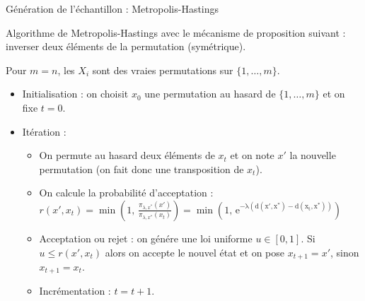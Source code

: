 \documentclass[10pt,xcolor=table,color={dvipsnames,usenames},ignorenonframetext,usepdftitle=false,french]{beamer}
\begin{document}
\begin{frame}{Génération de l'échantillon : Metropolis-Hastings}
\protect\hypertarget{guxe9nuxe9ration-de-luxe9chantillon-metropolis-hastings}{}

Algorithme de Metropolis-Hastings avec le mécanisme de proposition
suivant : inverser deux éléments de la permutation (symétrique).

Pour \(m=n\), les \(X_i\) sont des vraies permutations sur
\(\{1,\dots,m\}\).

\begin{itemize}
\item Initialisation : on choisit $x_0$ une permutation au hasard de $\{1,\dots,m\}$ et on fixe $t=0$.
\item Itération : 
\begin{itemize}
\item On permute au hasard deux éléments de $x_t$ et on note $x'$ la nouvelle permutation (on fait donc une transposition de $x_t$).
\item On calcule la probabilité d'acceptation : $r(x',x_t)=\min\left(1,\,\frac{\pi_{\lambda,x^*}(x')}{\pi_{\lambda,x^*}(x_{t})}\right)
=\min\left(1,\,\mathrm{e^{-\lambda(d(x',x^{*})-d(x_{t},x^{*}))}}\right)$
\item Acceptation ou rejet : on génére une loi uniforme $u\in[0,1]$. Si $u \leq r(x',x_{t}) $ alors on accepte le nouvel état et on pose $x_{t+1}=x'$, sinon $x_{t+1}=x_{t}$.
\item Incrémentation : $t=t+1$.
\end{itemize}
\end{itemize}

\end{frame}
\end{document}
